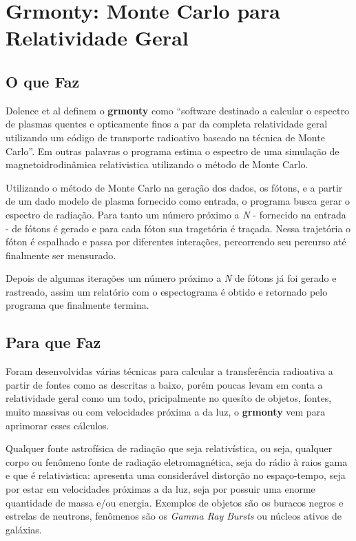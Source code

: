 \chapter{Grmonty: Monte Carlo para Relatividade Geral}
\label{cap:grmonty}

\section{O que Faz}
  Dolence et al definem o \textbf{grmonty} como ``software destinado a calcular o espectro de plasmas quentes e opticamente finos a par da completa relatividade geral utilizando um código de transporte radioativo baseado na técnica de Monte Carlo''\citep[p.1, traduzido]{Dolence:09}. Em outras palavras o programa estima o espectro de uma simulação de magnetoidrodinâmica relativistica utilizando o método de Monte Carlo.

  Utilizando o método de Monte Carlo na geração dos dados, os fótons, e a partir de um dado modelo de plasma fornecido como entrada, o programa busca gerar o espectro de radiação. Para tanto um número próximo a \textit{N} - fornecido na entrada - de fótons é gerado e para cada fóton sua tragetória é traçada. Nessa trajetória o fóton é espalhado e passa por diferentes interações, percorrendo seu percurso até finalmente ser mensurado.

  Depois de algumas iterações um número próximo a \textit{N} de fótons já foi gerado e rastreado, assim um relatório com o espectograma é obtido e retornado pelo programa que finalmente termina.

\section{Para que Faz}
  Foram desenvolvidas várias técnicas para calcular a transferência radioativa a partir de fontes como as descritas a baixo\citep{Dolence:09}, porém poucas levam em conta a relatividade geral como um todo, pricipalmente no quesíto de objetos, fontes, muito massivas ou com velocidades próxima a da luz, o \textbf{grmonty} vem para aprimorar esses cálculos.

  Qualquer fonte astrofísica de radiação que seja relativística, ou seja, qualquer corpo ou fenômeno fonte de radiação eletromagnética, seja do rádio à raios gama e que é relativistica: apresenta uma considerável distorção no espaço-tempo, seja por estar em velocidades próximas a da luz, seja por possuir uma enorme quantidade de massa e/ou energia. Exemplos de objetos são os buracos negros e estrelas de neutrons, fenômenos são os \textit{Gamma Ray Bursts} ou núcleos ativos de galáxias.


